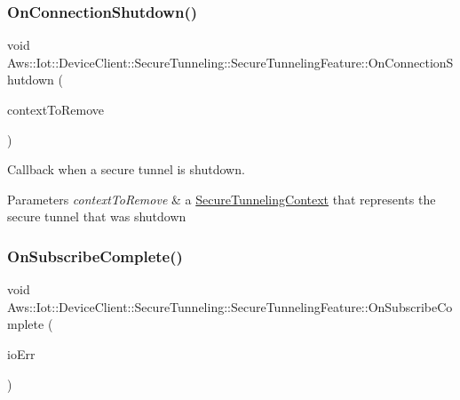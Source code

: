 \subsubsection{\texorpdfstring{On\+Connection\+Shutdown()}{OnConnectionShutdown()}}
{\footnotesize\ttfamily void Aws\+::\+Iot\+::\+Device\+Client\+::\+Secure\+Tunneling\+::\+Secure\+Tunneling\+Feature\+::\+On\+Connection\+Shutdown (\begin{DoxyParamCaption}\item[{\hyperlink{class_aws_1_1_iot_1_1_device_client_1_1_secure_tunneling_1_1_secure_tunneling_context}{Secure\+Tunneling\+Context} $\ast$}]{context\+To\+Remove }\end{DoxyParamCaption})\hspace{0.3cm}{\ttfamily [private]}}



Callback when a secure tunnel is shutdown. 


\begin{DoxyParams}{Parameters}
{\em context\+To\+Remove} & a \hyperlink{class_aws_1_1_iot_1_1_device_client_1_1_secure_tunneling_1_1_secure_tunneling_context}{Secure\+Tunneling\+Context} that represents the secure tunnel that was shutdown \\
\hline
\end{DoxyParams}
\mbox{\label{class_aws_1_1_iot_1_1_device_client_1_1_secure_tunneling_1_1_secure_tunneling_feature_ac883c84d52e745b2e58b039c60416d09}} 
\subsubsection{\texorpdfstring{On\+Subscribe\+Complete()}{OnSubscribeComplete()}}
{\footnotesize\ttfamily void Aws\+::\+Iot\+::\+Device\+Client\+::\+Secure\+Tunneling\+::\+Secure\+Tunneling\+Feature\+::\+On\+Subscribe\+Complete (\begin{DoxyParamCaption}\item[{int}]{io\+Err }\end{DoxyParamCaption})\hspace{0.3cm}{\ttfamily [private]}}



